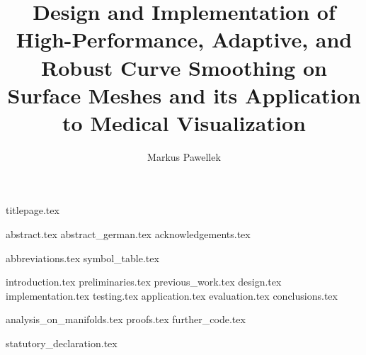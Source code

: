 \documentclass[fleqn,10pt,twoside]{stdglobal}
\title{Design and Implementation of High-Performance, Adaptive, and Robust Curve Smoothing on Surface Meshes and its Application to Medical Visualization}
\author{Markus Pawellek}
\let\oldpagenumbering\pagenumbering
\renewcommand*\pagenumbering[1]{\cleardoublepage\oldpagenumbering{#1}}
\numberwithin{figure}{section}
\numberwithin{table}{section}
\begin{document}

  {titlepage.tex}

  {abstract.tex}
  \cleardoublepage
  {abstract_german.tex}
  {acknowledgements.tex}

  \tableofcontents
  \listoffigures
  \listoftables
  \listofmath
  {
    \small
    \listofcode
  }
  {abbreviations.tex}
  {symbol_table.tex}

  {introduction.tex}
  {preliminaries.tex}
  {previous_work.tex}
  {design.tex}
  {implementation.tex}
  {testing.tex}
  {application.tex}
  {evaluation.tex}
  {conclusions.tex}

  \nocite{*}
  \printbibheading[heading=bibintoc]
  \printbibliography[heading=subbibliography,title={Books},type=book]
  \printbibliography[heading=subbibliography,title={Online Resources},type=online]
  \printbibliography[heading=subbibliography,title={General},nottype=book,nottype=online]

  \appendix
  {analysis_on_manifolds.tex}
  {proofs.tex}
  {further_code.tex}

  {statutory_declaration.tex}
\end{document}
